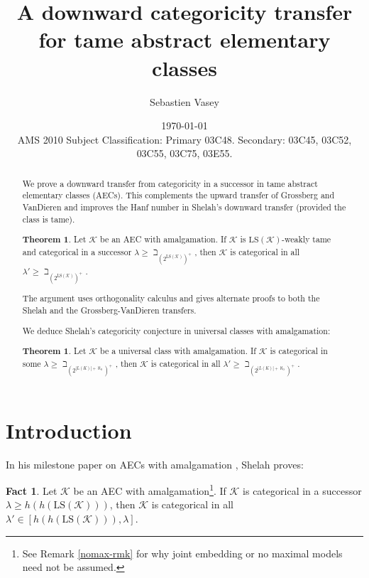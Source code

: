 \documentclass[12pt]{amsart}
\title[Downward categoricity in tame AECs]{A downward categoricity transfer for tame abstract elementary classes}
\date{\today\\
AMS 2010 Subject Classification: Primary 03C48. Secondary: 03C45, 03C52, 03C55, 03C75, 03E55.}
\author{Sebastien Vasey}
\theoremstyle{definition}
\newtheorem{thm}[mydef]{Theorem}
\newtheorem{fact}[mydef]{Fact}
\begin{document}
\begin{abstract}
  We prove a downward transfer from categoricity in a successor in tame abstract elementary classes (AECs). This complements the upward transfer of Grossberg and VanDieren and improves the Hanf number in Shelah's downward transfer (provided the class is tame).
 
  \begin{thm}\label{main-thm-abstract}
  Let ${\mathcal{K}}$ be an AEC with amalgamation. If ${\mathcal{K}}$ is ${\text{LS}} ({\mathcal{K}})$-weakly tame and categorical in a successor $\lambda \ge \beth_{\left(2^{{\text{LS}} ({\mathcal{K}})}\right)^+}$, then ${\mathcal{K}}$ is categorical in all $\lambda' \ge \beth_{\left(2^{{\text{LS}} ({\mathcal{K}})}\right)^+}$.
  \end{thm}

  The argument uses orthogonality calculus and gives alternate proofs to both the Shelah and the Grossberg-VanDieren transfers. 

  We deduce Shelah's categoricity conjecture in universal classes with amalgamation:

  \begin{thm}\label{abstract-thm-2}
    Let ${\mathcal{K}}$ be a universal class with amalgamation. If ${\mathcal{K}}$ is categorical in some $\lambda \ge \beth_{\left(2^{|L (K)| + \aleph_0}\right)^+}$, then ${\mathcal{K}}$ is categorical in all $\lambda' \ge \beth_{\left(2^{|L (K)| + \aleph_0}\right)^+}$.
  \end{thm}
\end{abstract}

\maketitle

\tableofcontents

\section{Introduction}

In his milestone paper on AECs with amalgamation \cite{sh394}, Shelah proves:

\begin{fact}\label{shelah-downward-categ}
  Let ${\mathcal{K}}$ be an AEC with amalgamation\footnote{See Remark \ref{nomax-rmk} for why joint embedding or no maximal models need not be assumed.}. If ${\mathcal{K}}$ is categorical in a successor $\lambda \ge {h ({{h ({{\text{LS}} ({\mathcal{K}})})}})}$, then ${\mathcal{K}}$ is categorical in all $\lambda' \in [{h ({{h ({{\text{LS}} ({\mathcal{K}})})}})}, \lambda]$.
\end{fact}
\end{document}
